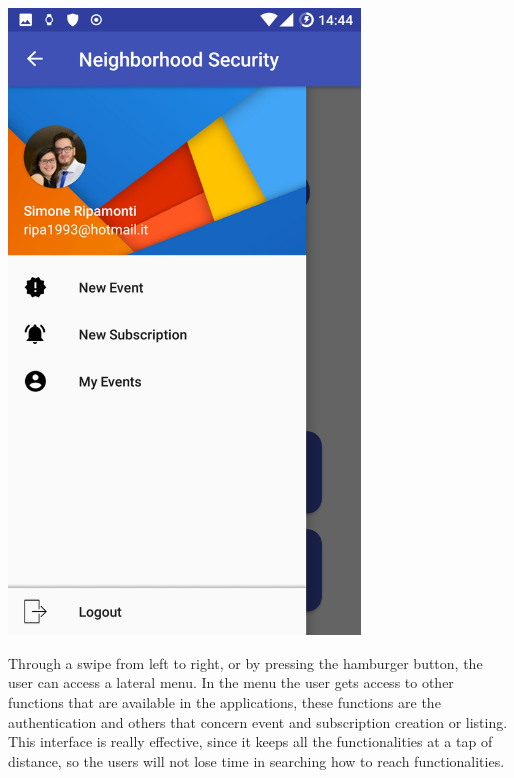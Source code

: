 \documentclass[a4paper]{scrreprt}
\begin{document}
\begin{minipage}{0.5\textwidth}
	\centering
	\includegraphics[width=0.7\textwidth]{home_drawer}
\end{minipage}
\begin{minipage}{0.5\textwidth}
	Through a swipe from left to right, or by pressing the hamburger button, the user can access a lateral menu. In the menu the user gets access to other functions that are available in the applications, these functions are the authentication and others that concern event and subscription creation or listing. This interface is really effective, since it keeps all the functionalities at a tap of distance, so the users will not lose time in searching how to reach functionalities.
\end{minipage}
\end{document}
